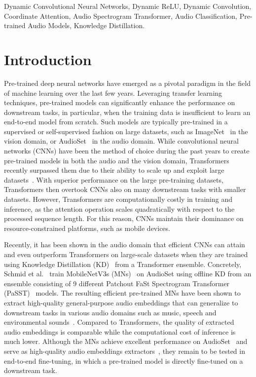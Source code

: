 \documentclass[lettersize,journal]{IEEEtran}
\begin{document}
\begin{IEEEkeywords}
Dynamic Convolutional Neural Networks, Dynamic ReLU, Dynamic Convolution, Coordinate Attention, Audio Spectrogram Transformer, Audio Classification, Pre-trained Audio Models, Knowledge Distillation.
\end{IEEEkeywords}

\section{Introduction}

Pre-trained deep neural networks have emerged as a pivotal paradigm in the field of machine learning over the last few years. Leveraging transfer learning techniques, pre-trained models can significantly enhance the performance on downstream tasks, in particular, when the training data is insufficient to learn an end-to-end model from scratch. Such models are typically pre-trained in a supervised or self-supervised fashion on large datasets, such as ImageNet~\cite{Deng09ImageNet} in the vision domain, or AudioSet~\cite{audioset2017Gemmeke} in the audio domain. While convolutional neural networks (CNNs) have been the method of choice during the past years to create pre-trained models in both the audio and the vision domain, Transformers~\cite{Vaswani17Attention} recently surpassed them due to their ability to scale up and exploit large datasets~\cite{Dosovitskiy20Image, Gong21Ast}. With superior performance on the large pre-training datasets, Transformers then overtook CNNs also on many downstream tasks with smaller datasets. However, Transformers are computationally costly in training and inference, as the attention operation scales quadratically with respect to the processed sequence length. For this reason, CNNs maintain their dominance on resource-constrained platforms, such as mobile devices.   

Recently, it has been shown in the audio domain that efficient CNNs can attain and even outperform Transformers on large-scale datasets when they are trained using Knowledge Distillation (KD)~\cite{Hinton2015distilling, Bucila06Compression, Ba14KD} from a Transformer ensemble. Concretely, Schmid et al.~\cite{Schmid22Efficient} train MobileNetV3s (MNs)~\cite{Howard19MobileNetV3} on AudioSet
using offline KD from an ensemble consisting of 9 different Patchout FaSt Spectrogram Transformer (PaSST)~\cite{Koutini21Passt} models. The resulting efficient pre-trained MNs have been shown to extract high-quality general-purpose audio embeddings that can generalize to downstream tasks in various audio domains such as music, speech and environmental sounds~\cite{schmid2023low}. Compared to Transformers, the quality of  extracted audio embeddings is comparable while the computational cost of inference is much lower. Although the MNs achieve excellent performance on AudioSet~\cite{Schmid22Efficient} and serve as high-quality audio embeddings extractors~\cite{schmid2023low}, they remain to be tested in end-to-end fine-tuning, in which a pre-trained model is directly fine-tuned on a downstream task.
\end{document}

